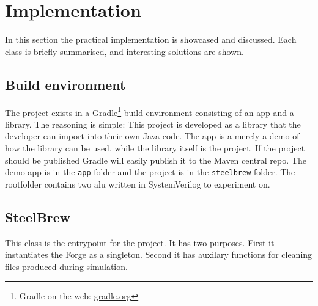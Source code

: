 \section{Implementation}\label{sec:05}
In this section the practical implementation is showcased and discussed. Each class is briefly summarised, and interesting solutions are shown.
\subsection{Build environment}
The project exists in a Gradle\footnote{Gradle on the web: \href{https://gradle.org/}{gradle.org}} build environment consisting of an app and a library. The reasoning is simple: This project is developed as a library that the developer can import into their own Java code. The app is a merely a demo of how the library can be used, while the library itself is the project. If the project should be published Gradle will easily publish it to the Maven central repo. The demo app is in the \texttt{app} folder and the project is in the \texttt{steelbrew} folder. The rootfolder contains two alu written in SystemVerilog to experiment on.
\subsection{SteelBrew}
This class is the entrypoint for the project. It has two purposes. First it instantiates the Forge as a singleton. Second it has auxilary functions for cleaning files produced during simulation.
